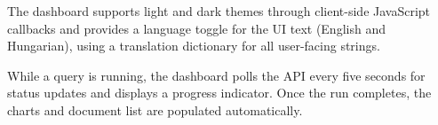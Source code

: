 The dashboard supports light and dark themes through client-side JavaScript callbacks and provides a language toggle for the UI text (English and Hungarian), using a translation dictionary for all user-facing strings.

While a query is running, the dashboard polls the API every five seconds for status updates and displays a progress indicator. Once the run completes, the charts and document list are populated automatically.
